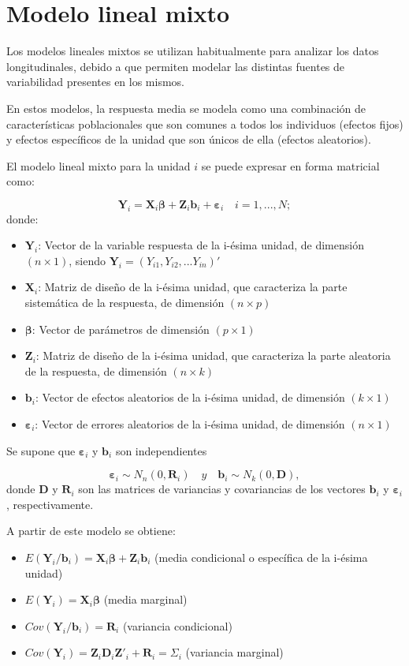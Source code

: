 \documentclass[spanish]{article}
\numberwithin{figure}{subsection}
\numberwithin{equation}{subsection}
\numberwithin{table}{subsection}
\begin{document}
\section{Modelo lineal mixto}

Los modelos lineales mixtos se utilizan habitualmente para analizar los datos
longitudinales, debido a que permiten modelar las distintas fuentes de
variabilidad presentes en los mismos.

En estos modelos, la respuesta media se modela como una combinación de
características poblacionales que son comunes a todos los individuos (efectos
fijos) y efectos específicos de la unidad que son únicos de ella (efectos
aleatorios).

El modelo lineal mixto para la unidad $i$ se puede expresar en forma matricial
como:

\[
	\bm{Y}_i = \bm{X}_i\bm{\beta} + \bm{Z}_i\bm{b}_i + \bm{\varepsilon}_i
	\quad i = 1, ..., N;
\]
donde:

\begin{itemize}
	\item $\bm{Y}_i$: Vector de la variable respuesta de la i-ésima unidad, de
	dimensión $(n \times 1)$, siendo $\bm{Y}_i = (Y_{i1}, Y_{i2}, ... Y_{in})'$
	\item $\bm{X}_i$: Matriz de diseño de la i-ésima unidad, que caracteriza la
	parte sistemática de la respuesta, de dimensión $(n \times p)$
	\item $\bm{\beta}$: Vector de parámetros de dimensión $(p \times 1)$
	\item $\bm{Z}_i$: Matriz de diseño de la i-ésima unidad, que caracteriza la
	parte aleatoria de la respuesta, de dimensión $(n \times k)$
	\item $\bm{b}_i$: Vector de efectos aleatorios de la i-ésima unidad, de
	dimensión $(k \times 1)$
	\item $\bm{\varepsilon}_i$: Vector de errores aleatorios de la i-ésima unidad,
	de dimensión $(n \times 1)$
\end{itemize}

Se supone que $\bm{\varepsilon}_i$ y $\bm{b}_i$ son independientes

\[ \bm{\varepsilon}_i \sim N_{n}(0, \bm{R}_i) \quad y \quad \bm{b}_i \sim N_k(0, \bm{D}), \]
donde $\bm{D}$ y $\bm{R}_i$ son las matrices de variancias y covariancias de los
vectores $\bm{b}_i$ y $\bm{\varepsilon}_i$, respectivamente.

A partir de este modelo se obtiene:

\begin{itemize}
	\item $E(\bm{Y}_i/\bm{b}_i) = \bm{X}_i\bm{\beta} + \bm{Z}_i\bm{b}_i$ (media condicional o específica de
	la i-ésima unidad)
	\item $E(\bm{Y}_i) = \bm{X}_i\bm{\beta}$ (media marginal)
	\item $Cov(\bm{Y}_i/\bm{b}_i) = \bm{R}_i$ (variancia condicional)
	\item $Cov(\bm{Y}_i) = \bm{Z}_i \bm{D}_i \bm{Z}'_i + \bm{R}_i = \bm{\varSigma}_i$ (variancia marginal)
\end{itemize}
\end{document}
